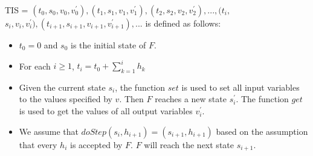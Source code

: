 TIS = $(t_{0},s_{0},v_{0},v_{0}^{\prime}), (t_{1},s_{1},v_{1},v_{1}^{\prime}),(t_{2},s_{2},v_{2},v_{2}^{\prime}), ..., (t_{i},$
$s_{i},v_{i},v_{i}^{\prime}), (t_{i+1},s_{i+1},v_{i+1},v_{i+1}^{\prime}), ...$ is
defined as follows:
\begin{itemize}
\item
$t_{0} = 0$ and $s_{0}$ is the initial state of $F$.
\item
For each $i \geqslant 1$, $t_{i} = t_{0} + \sum_{k = 1}^i h_{k}$
\item
Given the current state $s_{i}$, the function $set$ is used to set all input variables to the values specified by $v$. Then $F$ reaches a new state $s_{i}^{\prime}$. The function $get$ is used to get the values of all output variables $v_{i}^{\prime}$.
\item 
We assume that $doStep(s_{i}, h_{i+1}) = (s_{i+1},h_{i+1})$ based on the assumption that every $h_{i}$ is accepted by $F$. $F$ will reach the next state $s_{i+1}$.
\end{itemize}

